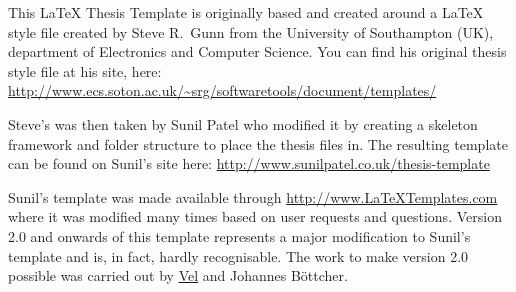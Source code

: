 This \LaTeX{} Thesis Template is originally based and created around a \LaTeX{} style file created by Steve R.\ Gunn from the University of Southampton (UK), department of Electronics and Computer Science. You can find his original thesis style file at his site, here:
\url{http://www.ecs.soton.ac.uk/~srg/softwaretools/document/templates/}

Steve's  was then taken by Sunil Patel who modified it by creating a skeleton framework and folder structure to place the thesis files in. The resulting template can be found on Sunil's site here:
\url{http://www.sunilpatel.co.uk/thesis-template}

Sunil's template was made available through \url{http://www.LaTeXTemplates.com} where it was modified many times based on user requests and questions. Version 2.0 and onwards of this template represents a major modification to Sunil's template and is, in fact, hardly recognisable. The work to make version 2.0 possible was carried out by \href{mailto:vel@latextemplates.com}{Vel} and Johannes Böttcher.
